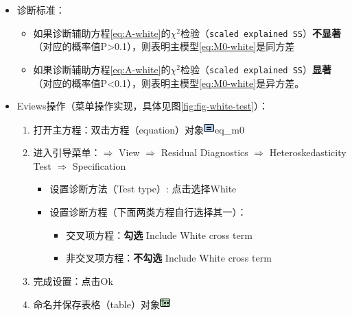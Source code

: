 \documentclass[12pt,(landscape,a4paper),(portrait,a4paper)]{article}
\providecommand{\tightlist}{%
  \setlength{\itemsep}{0pt}\setlength{\parskip}{0pt}}
\begin{document}
\begin{itemize}
\tightlist
\item
  诊断标准：

  \begin{itemize}
  \tightlist
  \item
    如果诊断辅助方程\eqref{eq:A-white}的\(\chi^2\)检验（\texttt{scaled\ explained\ SS}）\textbf{不显著}（对应的概率值P\textgreater{}0.1），则表明主模型\eqref{eq:M0-white}是同方差
  \item
    如果诊断辅助方程\eqref{eq:A-white}的\(\chi^2\)检验（\texttt{scaled\ explained\ SS}）\textbf{显著}（对应的概率值P\textless{}0.1），则表明主模型\eqref{eq:M0-white}是异方差。
  \end{itemize}
\item
  Eviews操作（菜单操作实现，具体见图\ref{fig:fig-white-test}）：

  \begin{enumerate}
  \def\labelenumi{\arabic{enumi})}
  \tightlist
  \item
    打开主方程：双击方程（equation）对象\includegraphics{picture/object/Equation.png}eq\_m0\\
  \item
    进入引导菜单：\(\Rightarrow\) View \(\Rightarrow\) Residual
    Diagnostics \(\Rightarrow\) Heteroskedasticity Test \(\Rightarrow\)
    Specification

    \begin{itemize}
    \tightlist
    \item
      设置诊断方法（Test type）: 点击选择White
    \item
      设置诊断方程（下面两类方程自行选择其一）：

      \begin{itemize}
      \tightlist
      \item
        交叉项方程：\textbf{勾选} Include White cross term
      \item
        非交叉项方程：\textbf{不勾选} Include White cross term
      \end{itemize}
    \end{itemize}
  \item
    完成设置：点击Ok\\
  \item
    命名并保存表格（table）对象\includegraphics{picture/object/Table.png}


\end{enumerate}
\end{itemize}
\end{document}
